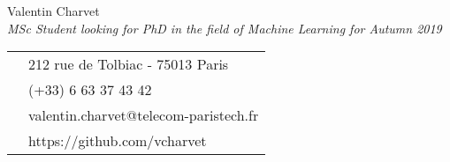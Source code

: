 \documentclass[a4paper,10.5pt]{article}
\begin{document}
	\vspace{1cm}
	\begin{paracol}{2}
		\begin{leftcolumn}
			\centering
			{\huge Valentin Charvet } \\
			\vspace{0.2cm}
			\Large \textit{MSc Student looking for PhD in the field of Machine Learning for Autumn 2019}%
		\end{leftcolumn}
		
		\begin{rightcolumn}
			\colorbox{shade}{
				\begin{tabular}{c|l}
						\faHome & \large212 rue de Tolbiac - 75013 Paris \\
						\faPhoneSquare & \large (+33) 6 63 37 43 42 \\
						\faEnvelope &\large valentin.charvet@telecom-paristech.fr \\
						\faGithub &\large https://github.com/vcharvet \\
				\end{tabular}
			}
	
	\end{rightcolumn}
			
	\end{paracol}
	


\setlength{\columnsep}{0.75cm}
\setlength{\columnseprule}{0.1pt}
	
\end{document}
